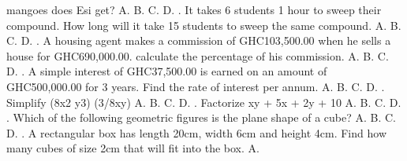 \documentclass{article}
\begin{document}
mangoes does Esi get? \newline \indent A. \newline \indent B. \newline \indent C. \newline \indent D.  \newline{}. It takes 6 students 1 hour to sweep their compound. How long will it take 15 students to sweep the same compound. \newline \indent A. \newline \indent B. \newline \indent C. \newline \indent D.  \newline{}. A housing agent makes a commission of GHC103,500.00 when he sells a house for GHC690,000.00. calculate the percentage of his commission. \newline \indent A. \newline \indent B. \newline \indent C. \newline \indent D.  \newline{}. A simple interest of GHC37,500.00 is earned on an amount of GHC500,000.00 for 3 years. Find the rate of interest per annum. \newline \indent A. \newline \indent B. \newline \indent C. \newline \indent D.  \newline{}. Simplify (8x2 y3) (3/8xy) \newline \indent A. \newline \indent B. \newline \indent C. \newline \indent D.  \newline{}. Factorize xy + 5x + 2y + 10 \newline \indent A. \newline \indent B. \newline \indent C. \newline \indent D.  \newline{}. Which of the following geometric figures is the plane shape of a cube? \newline \indent A. \newline \indent B. \newline \indent C. \newline \indent D.  \newline{}. A rectangular box has length 20cm, width 6cm and height 4cm. Find how many cubes of size 2cm that will fit into the box. \newline \indent A. \newline 
\end{document}
